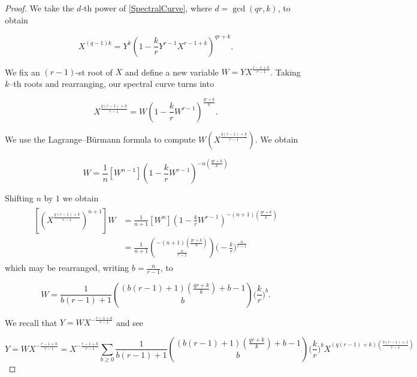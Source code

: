 \documentclass[10pt,a4paper,oneside,no-math,reqno]{amsart}%
\theoremstyle{plain}
\theoremstyle{definition}
\theoremstyle{remark}
\numberwithin{equation}{section}
\newcommand{\1}{\mathds{1}}
\newcommand{\<}{\langle}
\renewcommand{\>}{\rangle}
\begin{document}
\begin{proof}
    We take the $d$-th power of \cref{SpectralCurve}, where $d=\gcd(qr,k)$, to obtain

    \begin{equation}
        X^{(q-1)k}
        =
        Y^k(1-\frac{k}{r}Y^{r-1}X^{r-1+k})^{qr+k}.
    \end{equation}

   We fix an $(r-1)$-st root of $ X$ and define a new variable $W=YX^{\frac{r-1+k}{r-1}}$. Taking $k$--th roots and rearranging, our spectral curve turns into

   \begin{equation}
       X^{\frac{q(r-1)+k}{r-1}}
       =
       W(1-\frac{k}{r} W^{r-1})^{\frac{qr+k}{k}}.
   \end{equation}

    We use the Lagrange--Bürmann formula to compute $W(X^{\frac{q(r-1)+k}{r-1}})$. We obtain
    
    \begin{equation}
        [(X^{\frac{q(r-1)+k}{r-1}})^n]W
        =
        \frac{1}{n}[W^{n-1}]\left(1-\frac{k}{r}W^{r-1} \right)^{-n\left(\frac{qr+k}{k}\right)}
    \end{equation}

    Shifting $n$ by $1$ we obtain
    \begin{align}
        \begin{split}
            [(X^{\frac{q(r-1)+k}{r-1}})^{n+1}]W
            &=
            \frac{1}{n+1}[W^{n}]\left(1-\frac{k}{r} W^{r-1} \right)^{-(n+1)\left(\frac{qr+k}{k}\right)}
            \\
            &=
            \frac{1}{n+1}\binom{-(n+1)\left(\frac{qr+k}{k}\right)}{\frac{n}{r-1}}\Big(-\frac{k}{r}\Big)^{\frac{n}{r-1}}
        \end{split}
    \end{align}
    which may be rearranged, writing $ b = \frac{n}{r-1}$, to
    
    \begin{equation}
        [(X^{q(r-1)+k})^{b+\frac{1}{r-1}}]W
        =
        \frac{1}{b(r-1)+1}\binom{(b(r-1)+1)\left(\frac{qr+k}{k}\right)+b-1}{b} \Big(\frac{k}{r}\Big)^b.
    \end{equation}


    We recall that $Y = W X^{-\frac{r-1+k}{r-1}}$ and see

    \begin{equation}
        Y
        =
        W X^{-\frac{r-1+k}{r-1}}
        =
        X^{-\frac{r-1+k}{r-1}}\sum_{b\ge0}\frac{1}{b(r-1)+1}\binom{(b(r-1)+1)\left(\frac{qr+k}{k}\right)+b-1}{b}\Big(\frac{k}{r}\Big)^b X^{(q(r-1)+k)(\frac{b(r-1)+1}{r-1})}
    \end{equation}


\end{proof}
\end{document}
